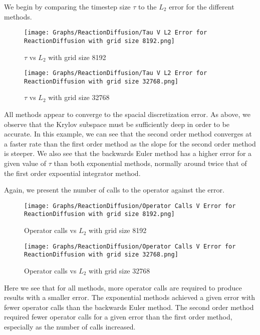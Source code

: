 We begin by comparing the timestep size $\tau$ to the $L_2$ error for the different methods.
\begin{figure}[H]
    \centering
    \begin{minipage}{0.49\textwidth}
        \texttt{[image: Graphs/ReactionDiffusion/Tau V L2 Error for ReactionDiffusion with grid size 8192.png]} %
        \caption{$\tau$ vs $L_2$ with grid size 8192}
        \label{fig:ACtauE}
    \end{minipage}\hfill
    \centering
    \begin{minipage}{0.49\textwidth}
        \texttt{[image: Graphs/ReactionDiffusion/Tau V L2 Error for ReactionDiffusion with grid size 32768.png]} %
        \caption{$\tau$ vs $L_2$ with grid size 32768}
        \label{fig:ACtauE1024}
    \end{minipage}\hfill
\end{figure}
All methods appear to converge to the spacial discretization error.
As above, we observe that the Krylov subspace must be sufficiently deep in order to be accurate.
In this example, we can see that the second order method converges at a faster rate than the first order method as the slope for the second order method is steeper.
We also see that the backwards Euler method has a higher error for a given value of $\tau$ than both exponential methods, normally around twice that of the first order expoential integrator method.

Again, we present the number of calls to the operator against the error.
\begin{figure}[H]
    \centering
    \begin{minipage}{0.49\textwidth}
        \texttt{[image: Graphs/ReactionDiffusion/Operator Calls V Error for ReactionDiffusion with grid size 8192.png]} %
        \caption{Operator calls vs $L_2$ with grid size 8192}
        \label{fig:plot1}
    \end{minipage}\hfill
    \centering
    \begin{minipage}{0.49\textwidth}
        \texttt{[image: Graphs/ReactionDiffusion/Operator Calls V Error for ReactionDiffusion with grid size 32768.png]} %
        \caption{Operator calls vs $L_2$ with grid size 32768}
        \label{fig:plot2}
    \end{minipage}\hfill
\end{figure}
Here we see that for all methods, more operator calls are required to produce results with a smaller error.
The exponential methods achieved a given error with fewer operator calls than the backwards Euler method.
The second order method required fewer operator calls for a given error than the first order method, especially as the number of calls increased.


